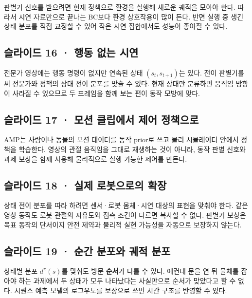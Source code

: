 \documentclass[11pt,a4paper]{article}
\begin{document}
판별기 신호를 받으려면 현재 정책으로 환경을 실행해 새로운 궤적을 모아야 한다. 따라서 시연 자료만으로 끝나는 BC보다 환경 상호작용이 많이 든다. 반면 실행 중 생긴 상태 분포를 직접 교정할 수 있어 작은 시연 집합에서도 성능이 좋아질 수 있다.\par

\subsection{슬라이드 16 · 행동 없는 시연}

전문가 영상에는 행동 명령이 없지만 연속된 상태 $(s_t,s_{t+1})$는 있다. 전이 판별기를 써 전문가와 정책의 상태 전이 분포를 맞출 수 있다. 현재 상태만 분류하면 움직임 방향이 사라질 수 있으므로 두 프레임을 함께 보는 편이 동작 모방에 맞다.\par

\subsection{슬라이드 17 · 모션 클립에서 제어 정책으로}

AMP는 사람이나 동물의 모션 데이터를 동작 prior로 쓰고 물리 시뮬레이터 안에서 정책을 학습한다. 영상의 관절 움직임을 그대로 재생하는 것이 아니라, 동작 판별 신호와 과제 보상을 함께 사용해 물리적으로 실행 가능한 제어를 만든다.\par

\subsection{슬라이드 18 · 실제 로봇으로의 확장}

상태 전이 분포를 따라 하려면 센서·로봇 몸체·시연 대상의 표현을 맞춰야 한다. 같은 영상 동작도 로봇 관절의 자유도와 접촉 조건이 다르면 복사할 수 없다. 판별기 보상은 목표 동작의 단서이지 안전 제약과 물리적 실현 가능성을 자동으로 보장하지 않는다.\par

\subsection{슬라이드 19 · 순간 분포와 궤적 분포}

상태별 분포 $d^\pi(s)$를 맞춰도 방문 \textbf{순서}가 다를 수 있다. 예컨대 문을 연 뒤 물체를 잡아야 하는 과제에서 두 상태가 모두 나타났다는 사실만으로 순서가 맞았다고 할 수 없다. 시퀀스 예측 모델의 로그우도를 보상으로 쓰면 시간 구조를 반영할 수 있다.\par
\end{document}
